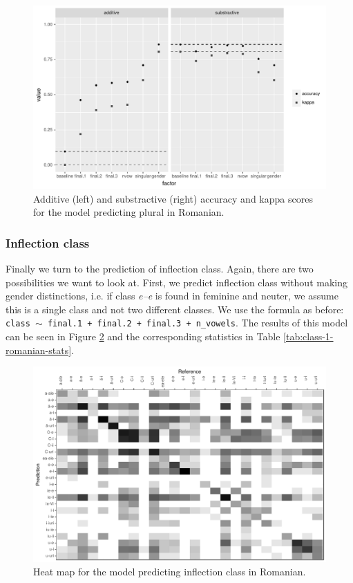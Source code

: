 \begin{figure}[!htpb]
  \centering
  \includegraphics[width=1.0\textwidth]{./figures/romanian/plural-overall.pdf}
  \caption{Additive (left) and substractive (right) accuracy and kappa scores for the model predicting plural in Romanian. }\label{fig:romanian-eval-pl}
\end{figure}

\subsubsection{Inflection class}

Finally we turn to the prediction of inflection class. Again, there are two possibilities we want to look at. First, we predict inflection class without making gender distinctions, i.e. if class \textit{e--e} is found in feminine and neuter, we assume this is a single class and not two different classes. We use the formula as before: \texttt{class $\sim$ final.1 + final.2 + final.3 + n\_vowels}. The results of this model can be seen in Figure \ref{fig:class-1-cm-romanian} and the corresponding statistics in Table \ref{tab:class-1-romanian-stats}.

\begin{figure}[!htpb]
  \centering
  \includegraphics[width=1.0\textwidth]{./figures/romanian/class-1-cm.pdf}
  \caption{Heat map for the model predicting inflection class in Romanian.}\label{fig:class-1-cm-romanian}
\end{figure}


